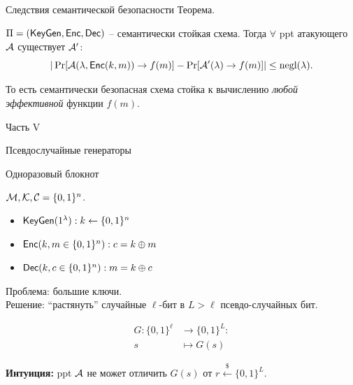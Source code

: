 \documentclass[usenames,dvipsnames,8pt,aspectratio=169]{beamer}
\begin{document}
\begin{frame}{Следствия семантической безопасности}
\Large
{\color{Orange} Теорема.} 

$ \Pi = (\textsf{KeyGen}, \textsf{Enc}, \textsf{Dec}) $ -- семантически стойкая схема. Тогда $\forall$ ppt атакующего $\mathcal{A}$ существует $\mathcal{A}'$:
\[
| \Pr[\mathcal{A}(\lambda, \textsf{Enc}(k, m)) \rightarrow f(m)] - \Pr[\mathcal{A}'(\lambda)\rightarrow f(m)] | \leq \mathrm{negl}(\lambda).
\]

\vspace{20pt}
То есть семантически безопасная схема стойка к вычислению \emph{любой эффективной} функции $f(m)$.
\end{frame}

\begin{frame}
Часть V \\ [10pt]
\begin{LARGE}
	
	\color{Orange}
	\Huge Псевдослучайные генераторы
	
\end{LARGE}
\end{frame}

\begin{frame}{Одноразовый блокнот}
\LARGE

$\mathcal{M}, \mathcal{K}, \mathcal{C} = \{0,1\}^n$. \\

\begin{itemize}
	\item $\textsf{KeyGen}(1^{\lambda}): k \leftarrow \{0,1\}^n$ \\[10pt]
	\item $\textsf{Enc}(k, m \in \{0,1\}^n): c = k \oplus m$ \\[10pt]
	\item $\textsf{Dec}(k, c \in \{0,1\}^n): m = k \oplus c$ \\[10pt]
\end{itemize}

{\color{Orange}  Проблема:} большие ключи. \\[10pt]

{\color{Orange}  Решение:}  ``растянуть'' случайные $\ell$-бит в $L > \ell$ {\color{Orange}  псевдо-случайных} бит.

\begin{align*}
G : \{0,1\}^{\ell} & \rightarrow \{0,1\}^{L}:	\\
s & \mapsto G(s) 
\end{align*}

{\color{Orange}\textbf{Интуиция:}}  ppt $\mathcal{A}$ не может отличить $G(s)$ от $r \xleftarrow{\$} \{0,1\}^L$.

\end{frame}
\end{document}
